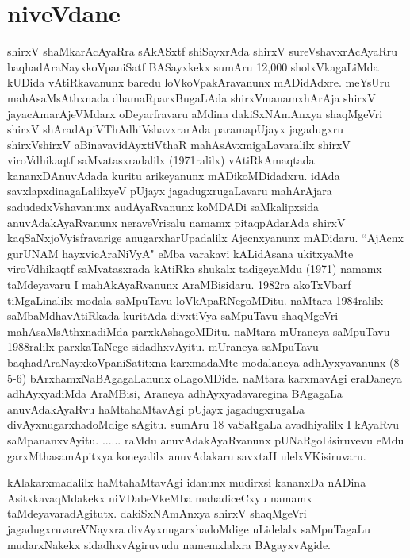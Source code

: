 \chapter{niveVdane}

shirxV shaMkarAcAyaRra sAkASxtf shiSayxrAda shirxV sureVshavxrAcAyaRru baqhadAraNayxkoVpaniSatf BASayxkekx sumAru 12,000 sholxVkagaLiMda kUDida vAtiRkavanunx baredu loVkoVpakAravanunx mADidAdxre. meYsUru mahAsaMsAthxnada dhamaRparxBugaLAda shirxVmanamxhArAja shirxV jayacAmarAjeVMdarx oDeyarfravaru aMdina dakiSxNAmAnxya shaqMgeVri shirxV shAradApiVThAdhiVshavxrarAda paramapUjayx jagadugxru shirxVshirxV aBinavavidAyxtiVthaR mahAsAvxmigaLavaralilx shirxV viroVdhikaqtf saMvatasxradalilx (1971ralilx) vAtiRkAmaqtada kananxDAnuvAdada kuritu arikeyanunx mADikoMDidadxru. idAda savxlapxdinagaLalilxyeV pUjayx jagadugxrugaLavaru mahArAjara sadudedxVshavanunx audAyaRvanunx koMDADi saMkalipxsida anuvAdakAyaRvanunx neraveVrisalu namamx pitaqpAdarAda shirxV kaqSaNxjoVyisfravarige anugarxharUpadalilx Ajecnxyanunx mADidaru. “AjAcnx gurUNAM hayxvicAraNiVyA" eMba varakavi kALidAsana ukitxyaMte viroVdhikaqtf saMvatasxrada kAtiRka shukalx tadigeyaMdu (1971) namamx taMdeyavaru I mahAkAyaRvanunx AraMBisidaru. 1982ra akoTxVbarf tiMgaLinalilx modala saMpuTavu loVkApaRNegoMDitu. naMtara 1984ralilx saMbaMdhavAtiRkada kuritAda divxtiVya saMpuTavu shaqMgeVri mahAsaMsAthxnadiMda parxkAshagoMDitu. naMtara mUraneya saMpuTavu 1988ralilx parxkaTaNege sidadhxvAyitu. mUraneya saMpuTavu baqhadAraNayxkoVpaniSatitxna karxmadaMte modalaneya adhAyxyavanunx (8-5-6) bArxhamxNaBAgagaLanunx oLagoMDide. naMtara karxmavAgi eraDaneya adhAyxyadiMda AraMBisi, Araneya adhAyxyadavaregina BAgagaLa anuvAdakAyaRvu haMtahaMtavAgi pUjayx jagadugxrugaLa divAyxnugarxhadoMdige sAgitu. sumAru 18 vaSaRgaLa avadhiyalilx I kAyaRvu saMpananxvAyitu. ...... raMdu anuvAdakAyaRvanunx pUNaRgoLisiruvevu eMdu garxMthasamApitxya koneyalilx anuvAdakaru savxtaH ulelxVKisiruvaru. 

kAlakarxmadalilx haMtahaMtavAgi idanunx mudirxsi kananxDa nADina AsitxkavaqMdakekx niVDabeVkeMba mahadiceCxyu namamx taMdeyavaradAgitutx. dakiSxNAmAnxya shirxV shaqMgeVri jagadugxruvareVNayxra divAyxnugarxhadoMdige uLidelalx saMpuTagaLu \break mudarxNakekx sidadhxvAgiruvudu namemxlalxra BAgayxvAgide.

